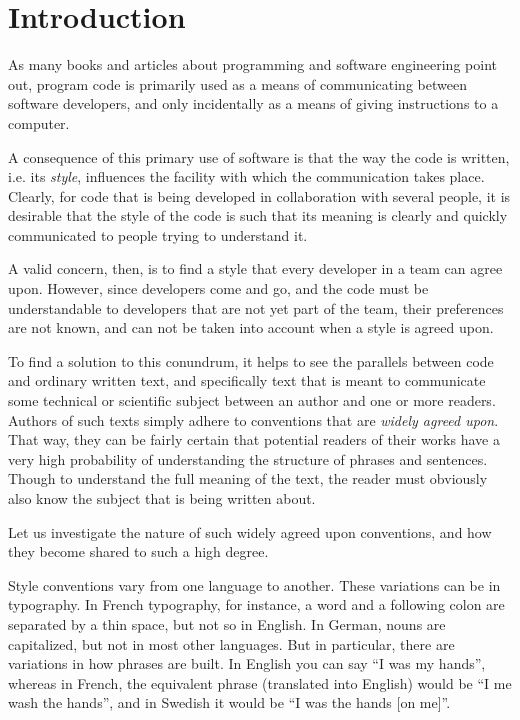 \chapter{Introduction}
%

As many books and articles about programming and software engineering
point out, program code is primarily used as a means of communicating
between software developers, and only incidentally as a means of
giving instructions to a computer.

A consequence of this primary use of software is that the way the code
is written, i.e. its \emph{style}, influences the facility with which
the communication takes place.  Clearly, for code that is being
developed in collaboration with several people, it is desirable that
the style of the code is such that its meaning is clearly and quickly
communicated to people trying to understand it.

A valid concern, then, is to find a style that every developer in a
team can agree upon.  However, since developers come and go, and the
code must be understandable to developers that are not yet part of the
team, their preferences are not known, and can not be taken into
account when a style is agreed upon.

To find a solution to this conundrum, it helps to see the parallels
between code and ordinary written text, and specifically text that is
meant to communicate some technical or scientific subject between an
author and one or more readers.  Authors of such texts simply adhere
to conventions that are \emph{widely agreed upon}.  That way, they can
be fairly certain that potential readers of their works have a very
high probability of understanding the structure of phrases and
sentences.  Though to understand the full meaning of the text, the
reader must obviously also know the subject that is being written
about.

Let us investigate the nature of such widely agreed upon conventions,
and how they become shared to such a high degree.  

Style conventions vary from one language to another.  These variations
can be in typography.  In French typography, for instance, a word and
a following colon are separated by a thin space, but not so in
English.  In German, nouns are capitalized, but not in most other
languages.  But in particular, there are variations in how phrases are
built.  In English you can say ``I was my hands'', whereas in French,
the equivalent phrase (translated into English) would be ``I me wash
the hands'', and in Swedish it would be ``I was the hands [on me]''.

